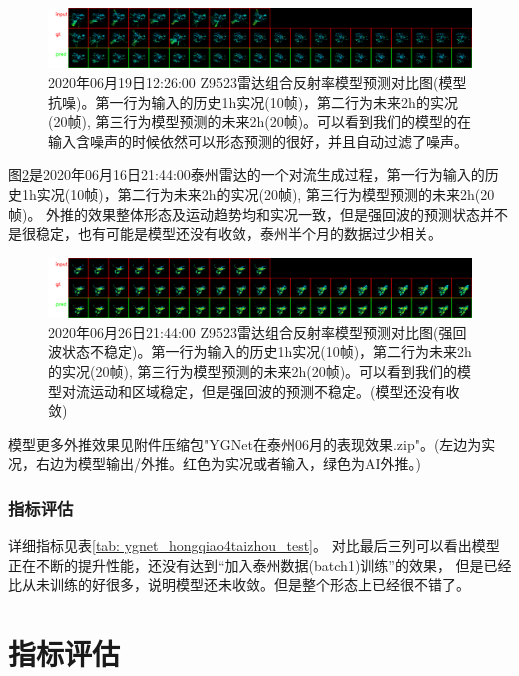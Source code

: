 \documentclass[10pt,english, openany]{book}
\begin{document}
\begin{figure}
	\centering
	\centering \includegraphics[scale=0.18]{Z_RADR_I_Z9523_20200619122600_O_DOR_SA_CAP.png}
	\caption{2020年06月19日12:26:00 Z9523雷达组合反射率模型预测对比图(模型抗噪)。第一行为输入的历史1h实况(10帧)，第二行为未来2h的实况(20帧), 第三行为模型预测的未来2h(20帧)。可以看到我们的模型的在输入含噪声的时候依然可以形态预测的很好，并且自动过滤了噪声。}
	\label{fig:sample6}
\end{figure}

图\ref{fig:sample7}是2020年06月16日21:44:00泰州雷达的一个对流生成过程，第一行为输入的历史1h实况(10帧)，第二行为未来2h的实况(20帧), 第三行为模型预测的未来2h(20帧)。
外推的效果整体形态及运动趋势均和实况一致，但是强回波的预测状态并不是很稳定，也有可能是模型还没有收敛，泰州半个月的数据过少相关。

\begin{figure}
	\centering
	\centering \includegraphics[scale=0.18]{Z_RADR_I_Z9523_20200626214400_O_DOR_SA_CAP.png}
	\caption{2020年06月26日21:44:00 Z9523雷达组合反射率模型预测对比图(强回波状态不稳定)。第一行为输入的历史1h实况(10帧)，第二行为未来2h的实况(20帧), 第三行为模型预测的未来2h(20帧)。可以看到我们的模型对流运动和区域稳定，但是强回波的预测不稳定。(模型还没有收敛)}
	\label{fig:sample7}
\end{figure}

模型更多外推效果见附件压缩包"YGNet在泰州06月的表现效果.zip"。(左边为实况，右边为模型输出/外推。红色为实况或者输入，绿色为AI外推。)

\subsection{指标评估}

详细指标见表\ref{tab: ygnet_hongqiao4taizhou_test}。 对比最后三列可以看出模型正在不断的提升性能，还没有达到“加入泰州数据(batch1)训练”的效果，
但是已经比从未训练的好很多，说明模型还未收敛。但是整个形态上已经很不错了。

\chapter{指标评估} \label{chapter: index}
\end{document}
